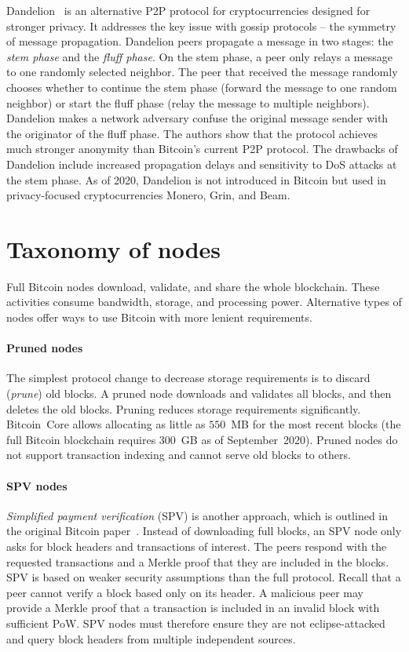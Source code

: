 Dandelion~\cite{Venkatakrishnan2017, Fanti2018} is an alternative P2P protocol for cryptocurrencies designed for stronger privacy.
It addresses the key issue with gossip protocols -- the symmetry of message propagation.
Dandelion peers propagate a message in two stages: the \textit{stem phase} and the \textit{fluff phase}.
On the stem phase, a peer only relays a message to one randomly selected neighbor.
The peer that received the message randomly chooses whether to continue the stem phase (forward the message to one random neighbor) or start the fluff phase (relay the message to multiple neighbors).
Dandelion makes a network adversary confuse the original message sender with the originator of the fluff phase.
The authors show that the protocol achieves much stronger anonymity than Bitcoin's current P2P protocol.
The drawbacks of Dandelion include increased propagation delays and sensitivity to DoS attacks at the stem phase.
As of 2020, Dandelion is not introduced in Bitcoin but used in privacy-focused cryptocurrencies Monero, Grin, and Beam.


\section{Taxonomy of nodes}
\label{sec:TaxonomyOfNodes}

Full Bitcoin nodes download, validate, and share the whole blockchain.
These activities consume bandwidth, storage, and processing power.
Alternative types of nodes offer ways to use Bitcoin with more lenient requirements.

\paragraph{Pruned nodes}
The simplest protocol change to decrease storage requirements is to discard (\textit{prune}) old blocks.
A pruned node downloads and validates all blocks, and then deletes the old blocks.
Pruning reduces storage requirements significantly.
Bitcoin~Core allows allocating as little as $550$~MB for the most recent blocks (the full Bitcoin blockchain requires $300$~GB as of September~2020).
Pruned nodes do not support transaction indexing and cannot serve old blocks to others.

\paragraph{SPV nodes}
\textit{Simplified payment verification} (SPV) is another approach, which is outlined in the original Bitcoin paper~\cite{Nakamoto2008}.
Instead of downloading full blocks, an SPV node only asks for block headers and transactions of interest.
The peers respond with the requested transactions and a Merkle proof that they are included in the blocks.
SPV is based on weaker security assumptions than the full protocol.
Recall that a peer cannot verify a block based only on its header.
A malicious peer may provide a Merkle proof that a transaction is included in an invalid block with sufficient PoW.
SPV nodes must therefore ensure they are not eclipse-attacked and query block headers from multiple independent sources.

